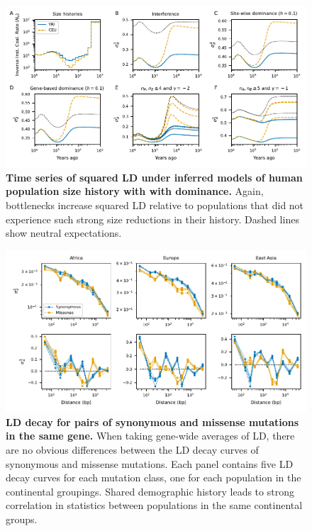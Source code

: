 \documentclass[]{article}
\begin{document}
\begin{figure}[ht!]
    \centering
    \includegraphics{../figures/demog_YRI_CEU.dominance.sd2}
    \caption{
        \textbf{Time series of squared LD under inferred models of human population
        size history with with dominance.}
        Again, bottlenecks increase squared LD relative to populations that did
        not experience such strong size reductions in their history.
        Dashed lines show neutral expectations.
    }
    \label{fig:relate_dom_sd2}
\end{figure}

\begin{figure}[ht!]
    \centering
    \includegraphics{../figures/ld_decay_gene_wide}
    \caption{
        \textbf{LD decay for pairs of synonymous and missense mutations
        in the same gene.}
        When taking gene-wide averages of LD, there are no obvious differences
        between the LD decay curves of synonymous and missense mutations.
        Each panel contains five LD decay curves for each mutation class, one for
        each \citet{1000_Genomes_Project_Consortium2015-zq} population in the
        continental groupings. Shared demographic history leads to strong
        correlation in statistics between populations in the same continental
        groups.
    }
    \label{fig:LDgene}
\end{figure}
\end{document}
